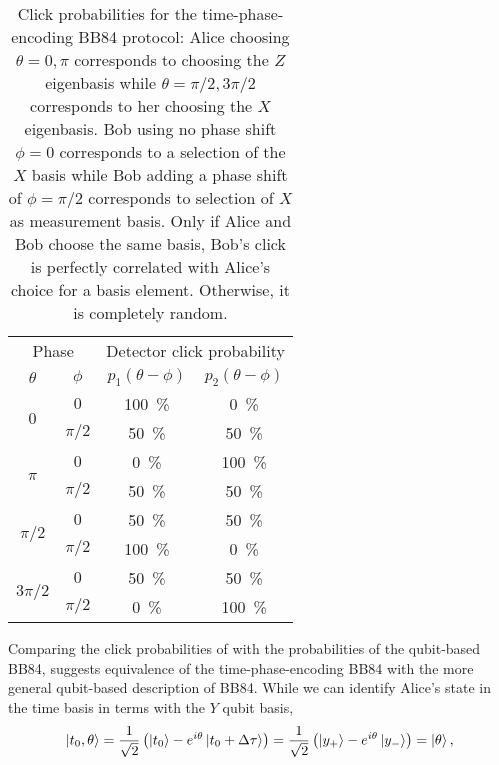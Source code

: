 \begin{table}[htb]
	\centering
	\begin{tabular}{cccc}
		\toprule
		\multicolumn{2}{c}{Phase} & \multicolumn{2}{c}{Detector click probability} \\
		\cmidrule{1-2}
		\cmidrule{3-4}
		$\theta$ & $\phi$ & $p_1(\theta-\phi)$ & $p_2(\theta-\phi)$ \\
		\midrule
		\multirow{2}{*}{$0$} & $0$ & \SI{100}{\percent} & \SI{0}{\percent} \\
		& $\pi/2$ & \SI{50}{\percent} & \SI{50}{\percent} \\
		\cmidrule{1-2}
		\multirow{2}{*}{$\pi$} & $0$ & \SI{0}{\percent} & \SI{100}{\percent} \\
		& $\pi/2$ & \SI{50}{\percent} & \SI{50}{\percent} \\
		\cmidrule{1-2}
		\multirow{2}{*}{$\pi/2$} & $0$ & \SI{50}{\percent} & \SI{50}{\percent} \\
		& $\pi/2$ & \SI{100}{\percent} & \SI{0}{\percent} \\
		\cmidrule{1-2}
		\multirow{2}{*}{$3\pi/2$} & $0$ & \SI{50}{\percent} & \SI{50}{\percent} \\
		& $\pi/2$ & \SI{0}{\percent} & \SI{100}{\percent} \\
		\bottomrule
	\end{tabular}
	\caption{Click probabilities for the time-phase-encoding BB84 protocol: Alice choosing $\theta=0,\pi$ corresponds to choosing the $Z$ eigenbasis while $\theta=\pi/2,3\pi/2$ corresponds to her choosing the $X$ eigenbasis. Bob using no phase shift $\phi=0$ corresponds to a selection of the $X$ basis while Bob adding a phase shift of $\phi=\pi/2$ corresponds to selection of $X$ as measurement basis. Only if Alice and Bob choose the same basis, Bob's click is perfectly correlated with Alice's choice for a basis element. Otherwise, it is completely random.}\label{tab:qubit_time_phase_clicks}
\end{table}
Comparing the click probabilities of  with the probabilities of the qubit-based BB84, suggests equivalence of the time-phase-encoding BB84 with the more general qubit-based description of BB84.
While we can identify Alice's state in the time basis in terms with the $Y$ qubit basis,
\begin{equation}
	\ket{t_0,\theta}
	=
	\frac{1}{\sqrt{2}}
	\left(
		\ket{t_0}
		-
		e^{i\theta}
		\ket{t_0+\Delta\tau}
	\right)
	=
	\frac{1}{\sqrt{2}}
	\left(
		\ket{y_+}
		-
		e^{i\theta}
		\ket{y_-}
	\right)
	=
	\ket{\theta}
	,
\end{equation}
